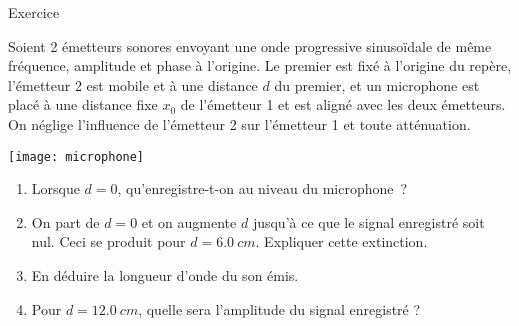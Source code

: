 \documentclass[../main/main.tex]{subfiles}
\begin{document}
\begin{rexem}{Exercice}
    \begin{minipage}{0.55\linewidth}
        Soient 2 émetteurs sonores envoyant une onde progressive sinusoïdale de
        même fréquence, amplitude et phase à l'origine. Le premier est fixé à
        l'origine du repère, l'émetteur 2 est mobile et à une distance $d$ du
        premier, et un microphone est placé à une distance fixe $x_0$ de
        l'émetteur 1 et est aligné avec les deux émetteurs. On néglige
        l'influence de l'émetteur 2 sur l'émetteur 1 et toute atténuation.
    \end{minipage}
    \hfill
    \begin{minipage}{0.45\linewidth}
        \begin{center}
            \texttt{[image: microphone]}
        \end{center}
    \end{minipage}
    \begin{enumerate}[label=\sqenumi]
        \item Lorsque $d=0$, qu'enregistre-t-on au niveau du microphone~?
        \item On part de $d=0$ et on augmente $d$ jusqu'à ce que le signal
            enregistré soit nul. Ceci se produit pour $d = \SI{6.0}{cm}$.
            Expliquer cette extinction.
        \item En déduire la longueur d'onde du son émis.
        \item Pour $d = \SI{12.0}{cm}$, quelle sera l'amplitude du signal
            enregistré ?
    \end{enumerate}
    \tcblower
\end{rexem}
\end{document}
